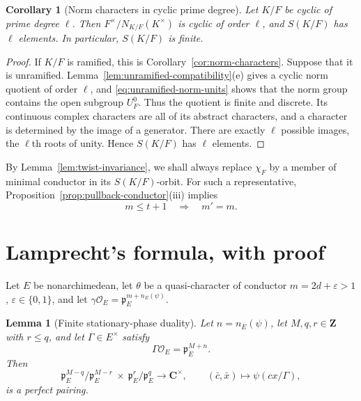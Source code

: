 \documentclass[11pt]{amsart}
\newtheorem{lemma}[theorem]{Lemma}
\newtheorem{corollary}[theorem]{Corollary}
\theoremstyle{definition}
\theoremstyle{remark}
\newcommand{\C}{\mathbf C}
\newcommand{\cO}{\mathcal O}
\newcommand{\p}{\mathfrak p}
\begin{document}
\begin{corollary}[Norm characters in cyclic prime degree]
\label{cor:prime-norm-characters}
Let $K/F$ be cyclic of prime degree $\ell$.  Then
$F^\times/N_{K/F}(K^\times)$ is cyclic of order $\ell$, and
$S(K/F)$ has $\ell$ elements.  In particular, $S(K/F)$ is finite.
\end{corollary}

\begin{proof}
If $K/F$ is ramified, this is
Corollary~\ref{cor:norm-characters}.  Suppose that it is unramified.
Lemma~\ref{lem:unramified-compatibility}(e) gives a cyclic norm
quotient of order $\ell$, and
\eqref{eq:unramified-norm-units} shows that the norm group contains the
open subgroup $U_F^0$.  Thus the quotient is finite and discrete.  Its
continuous complex characters are all of its abstract characters, and
a character is determined by the image of a generator.  There are
exactly $\ell$ possible images, the $\ell$th roots of unity.  Hence
$S(K/F)$ has $\ell$ elements.
\end{proof}

By Lemma~\ref{lem:twist-invariance}, we shall always replace $\chi_F$
by a member of minimal conductor in its $S(K/F)$-orbit.  For such a
representative, Proposition~\ref{prop:pullback-conductor}(iii) implies
\begin{equation}\label{eq:minimal-critical}
 m\leq t+1\quad\Longrightarrow\quad m'=m.
\end{equation}

\section{Lamprecht's formula, with proof}

Let $E$ be nonarchimedean, let $\theta$ be a quasi-character of
conductor $m=2d+\varepsilon>1$, $\varepsilon\in\{0,1\}$, and let
$\gamma\cO_E=\p_E^{m+n_E(\psi)}$.

\begin{lemma}[Finite stationary-phase duality]\label{lem:finite-duality}
Let $n=n_E(\psi)$, let $M,q,r\in\mathbf Z$ with $r\le q$, and let
$\Gamma\in E^\times$ satisfy
\[
 \Gamma\cO_E=\p_E^{M+n}.
\]
Then
\begin{equation}\label{eq:general-stationary-pairing}
 \p_E^{M-q}/\p_E^{M-r}\ \times\
 \p_E^r/\p_E^q
 \longrightarrow\C^\times,
 \qquad(\bar c,\bar x)\longmapsto\psi(cx/\Gamma),
\end{equation}
is a perfect pairing.
\end{lemma}
\end{document}

